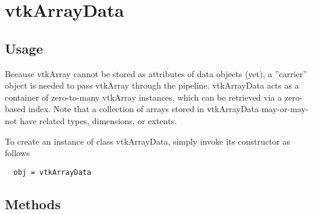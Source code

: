 \section{vtkArrayData}

\subsection{Usage}

 Because vtkArray cannot be stored as attributes of data objects (yet), a ''carrier''
 object is needed to pass vtkArray through the pipeline.  vtkArrayData acts as a
 container of zero-to-many vtkArray instances, which can be retrieved via a zero-based
 index.  Note that a collection of arrays stored in vtkArrayData may-or-may-not have related
 types, dimensions, or extents.


To create an instance of class vtkArrayData, simply
invoke its constructor as follows
\begin{verbatim}
  obj = vtkArrayData
\end{verbatim}
\subsection{Methods}

